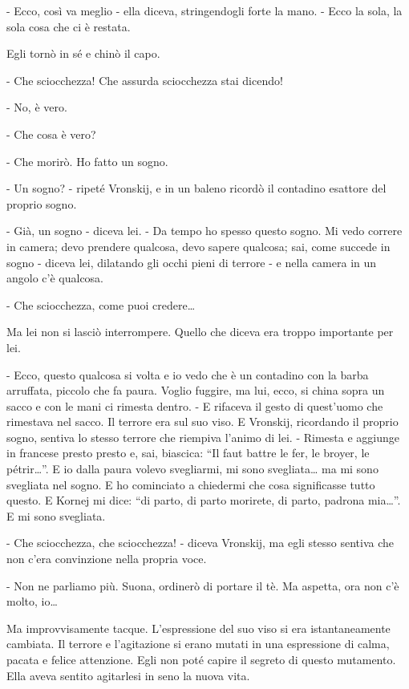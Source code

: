 - Ecco, così va meglio - ella diceva, stringendogli forte la mano. - Ecco la sola, la sola cosa che ci è restata. 

Egli tornò in sé e chinò il capo. 

- Che sciocchezza! Che assurda sciocchezza stai dicendo! 

- No, è vero. 

- Che cosa è vero? 

- Che morirò. Ho fatto un sogno. 

- Un sogno? - ripeté Vronskij, e in un baleno ricordò il contadino esattore del proprio sogno. 

- Già, un sogno - diceva lei. - Da tempo ho spesso questo sogno. Mi vedo correre in camera; devo prendere qualcosa, devo sapere qualcosa; sai, come succede in sogno - diceva lei, dilatando gli occhi pieni di terrore - e nella camera in un angolo c'è qualcosa. 

- Che sciocchezza, come puoi credere\ldots{} 

Ma lei non si lasciò interrompere. Quello che diceva era troppo importante per lei. 

- Ecco, questo qualcosa si volta e io vedo che è un contadino con la barba arruffata, piccolo che fa paura. Voglio fuggire, ma lui, ecco, si china sopra un sacco e con le mani ci rimesta dentro. - E rifaceva il gesto di quest'uomo che rimestava nel sacco. Il terrore era sul suo viso. E Vronskij, ricordando il proprio sogno, sentiva lo stesso terrore che riempiva l'animo di lei. - Rimesta e aggiunge in francese presto presto e, sai, biascica: ``Il faut battre le fer, le broyer, le pétrir\ldots{}''. E io dalla paura volevo svegliarmi, mi sono svegliata\ldots{} ma mi sono svegliata nel sogno. E ho cominciato a chiedermi che cosa significasse tutto questo. E Kornej mi dice: ``di parto, di parto morirete, di parto, padrona mia\ldots{}''. E mi sono svegliata. 

- Che sciocchezza, che sciocchezza! - diceva Vronskij, ma egli stesso sentiva che non c'era convinzione nella propria voce. 

- Non ne parliamo più. Suona, ordinerò di portare il tè. Ma aspetta, ora non c'è molto, io\ldots{} 

Ma improvvisamente tacque. L'espressione del suo viso si era istantaneamente cambiata. Il terrore e l'agitazione si erano mutati in una espressione di calma, pacata e felice attenzione. Egli non poté capire il segreto di questo mutamento. Ella aveva sentito agitarlesi in seno la nuova vita. 

